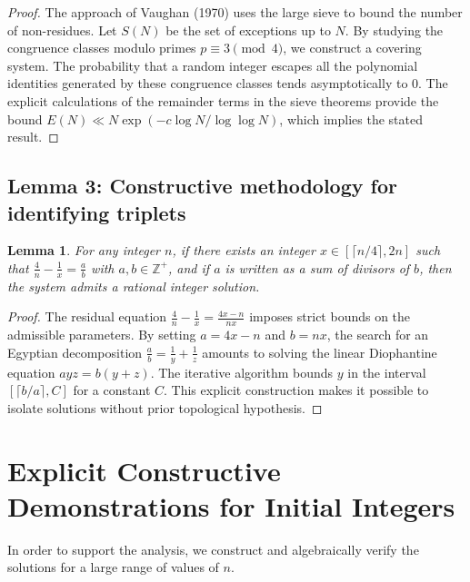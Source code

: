\documentclass[11pt,a4paper]{article}
\newtheorem{lemma}[theorem]{Lemma}
\begin{document}
\begin{proof}
The approach of Vaughan (1970) uses the large sieve to bound the number of non-residues. Let $S(N)$ be the set of exceptions up to $N$. By studying the congruence classes modulo primes $p \equiv 3 \pmod 4$, we construct a covering system. The probability that a random integer escapes all the polynomial identities generated by these congruence classes tends asymptotically to $0$. The explicit calculations of the remainder terms in the sieve theorems provide the bound $E(N) \ll N \exp(-c \log N / \log \log N)$, which implies the stated result.
\end{proof}

\subsection{Lemma 3: Constructive methodology for identifying triplets}

\begin{lemma}
For any integer $n$, if there exists an integer $x \in [\lceil n/4 \rceil, 2n]$ such that $\frac{4}{n} - \frac{1}{x} = \frac{a}{b}$ with $a, b \in \mathbb{Z}^{+}$, and if $a$ is written as a sum of divisors of $b$, then the system admits a rational integer solution.
\end{lemma}

\begin{proof}
The residual equation $\frac{4}{n} - \frac{1}{x} = \frac{4x-n}{nx}$ imposes strict bounds on the admissible parameters. By setting $a = 4x-n$ and $b = nx$, the search for an Egyptian decomposition $\frac{a}{b} = \frac{1}{y} + \frac{1}{z}$ amounts to solving the linear Diophantine equation $a y z = b(y + z)$. The iterative algorithm bounds $y$ in the interval $[\lceil b/a \rceil, C]$ for a constant $C$. This explicit construction makes it possible to isolate solutions without prior topological hypothesis.
\end{proof}

\section{Explicit Constructive Demonstrations for Initial Integers}

In order to support the analysis, we construct and algebraically verify the solutions for a large range of values of $n$.
\end{document}
